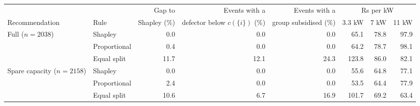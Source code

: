 \begin{tabular}{llrrrrrr}
\toprule
 & & Gap to & Events with a & Events with a & \multicolumn{3}{c}{Rs per kW} \\
\cmidrule(l){6-8}
Recommendation & Rule & Shapley (\%) & defector below $c(\{i\})$ (\%) & group subsidised (\%) & 3.3 kW & 7 kW & 11 kW \\
\midrule
Full ($n=2038$) & Shapley & 0.0 & 0.0 & 0.0 & 65.1 & 78.8 & 97.9 \\
 & Proportional & 0.4 & 0.0 & 0.0 & 64.2 & 78.7 & 98.1 \\
 & Equal split & 11.7 & 12.1 & 24.3 & 123.8 & 86.0 & 82.1 \\
\midrule
Spare capacity ($n=2158$) & Shapley & 0.0 & 0.0 & 0.0 & 55.6 & 64.8 & 77.1 \\
 & Proportional & 2.4 & 0.0 & 0.0 & 53.5 & 64.4 & 77.9 \\
 & Equal split & 10.6 & 6.7 & 16.9 & 101.7 & 69.2 & 63.4 \\
\bottomrule
\end{tabular}
